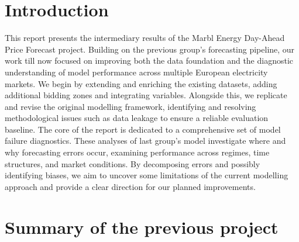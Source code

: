 \documentclass[12pt, a4paper]{article}
\begin{document}
\section{Introduction}
This report presents the intermediary results of the Marbl Energy Day-Ahead Price Forecast project. Building on the previous group’s forecasting pipeline, our work till now focused on improving both the data foundation and the diagnostic understanding of model performance across multiple European electricity markets.
We begin by extending and enriching the existing datasets, adding additional bidding zones and integrating variables. Alongside this, we replicate and revise the original modelling framework, identifying and resolving methodological issues such as data leakage to ensure a reliable evaluation baseline.
The core of the report is dedicated to a comprehensive set of model failure diagnostics. These analyses of last group’s model investigate where and why forecasting errors occur, examining performance across regimes, time structures, and market conditions. By decomposing errors and possibly identifying biases, we aim to uncover some limitations of the current modelling approach and provide a clear direction for our planned improvements.

\section{Summary of the previous project}
\end{document}
